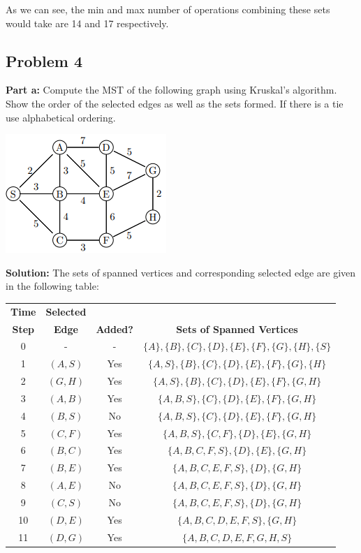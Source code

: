 \documentclass{article}
\begin{document}
As we can see, the min and max number of operations combining these sets would take are 14 and 17 respectively.

\subsection*{Problem 4}
\noindent\textbf{Part a:} Compute the MST of the following graph using Kruskal’s algorithm. Show the order of the selected edges as well as the sets formed. If there is a tie use alphabetical ordering.
\begin{center}
  \includegraphics{graph4a.png}
\end{center}
\bigskip

\noindent\textbf{Solution:} The sets of spanned vertices and corresponding selected edge are given in the following table:
\begin{center}
\begin{tabular}{c|c|c|c}
  \textbf{Time} & \textbf{Selected} & &\\
  \textbf{Step} & \textbf{Edge} & \textbf{Added?} & \textbf{Sets of Spanned Vertices}\\
  \hline
  0 & - & - & $\{A\},\{B\},\{C\},\{D\},\{E\},\{F\},\{G\},\{H\},\{S\}$\\
  \hline
  1 & $(A,S)$ & Yes & $\{A,S\},\{B\},\{C\},\{D\},\{E\},\{F\},\{G\},\{H\}$\\
  \hline
  2 & $(G,H)$ & Yes & $\{A,S\},\{B\},\{C\},\{D\},\{E\},\{F\},\{G,H\}$\\
  \hline
  3 & $(A,B)$ & Yes & $\{A,B,S\},\{C\},\{D\},\{E\},\{F\},\{G,H\}$\\
  \hline
  4 & $(B,S)$ & No &  $\{A,B,S\},\{C\},\{D\},\{E\},\{F\},\{G,H\}$\\
  \hline
  5 & $(C,F)$ & Yes & $\{A,B,S\},\{C,F\},\{D\},\{E\},\{G,H\}$\\
  \hline
  6 & $(B,C)$ & Yes & $\{A,B,C,F,S\},\{D\},\{E\},\{G,H\}$\\
  \hline
  7 & $(B,E)$ & Yes & $\{A,B,C,E,F,S\},\{D\},\{G,H\}$\\
  \hline
  8 & $(A,E)$ & No &  $\{A,B,C,E,F,S\},\{D\},\{G,H\}$\\
  \hline
  9 & $(C,S)$ & No &  $\{A,B,C,E,F,S\},\{D\},\{G,H\}$\\
  \hline
  10 & $(D,E)$ & Yes & $\{A,B,C,D,E,F,S\},\{G,H\}$\\
  \hline
  11 & $(D,G)$ & Yes & $\{A,B,C,D,E,F,G,H,S\}$
\end{tabular}
\end{center}
\smallskip
\end{document}
